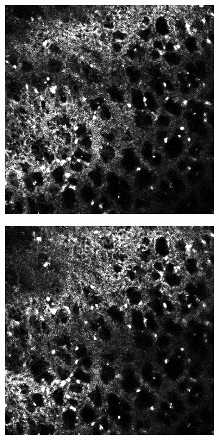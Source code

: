 \begin{figure}[h]
\begin{subfigure}{.32\textwidth}
		\end{subfigure}%
		\hfill
		\begin{subfigure}{.32\textwidth}
		\includegraphics[width=\textwidth]{images/shutterseriesm170_13cropped003}
		\end{subfigure}%
		\vspace{0.2cm}
		\begin{subfigure}{.32\textwidth}
		\includegraphics[width=\textwidth]{images/shutterseriesm170_13cropped004}

\end{subfigure}
\end{figure}

